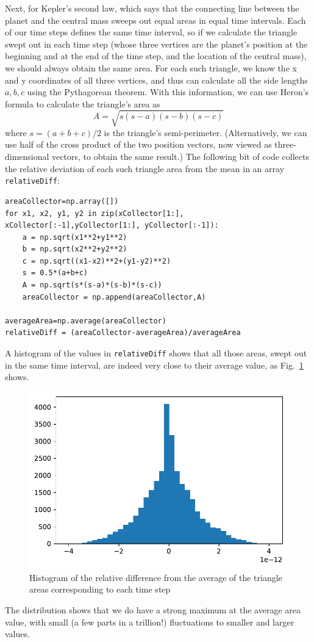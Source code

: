 \documentclass[twocolumn,apj]{openjournal}
\newcommand{\be}{\begin{equation}}
\newcommand{\ee}{\end{equation}}
\begin{document}
Next, for Kepler's second law, which says that the connecting line between the planet and the central mass sweeps out equal areas in equal time intervals. Each of our time steps defines the same time interval, so if we calculate the triangle swept out in each time step (whose three vertices are the planet's position at the beginning and at the end of the time step, and the location of the central mass), we should always obtain the same area. For each such triangle, we know the x and y coordinates of all three vertices, and thus can calculate all the side lengths $a,b,c$ using the Pythagorean theorem. With this information, we can use Heron's formula to calculate the triangle's area as
\be
A = \sqrt{s(s-a)(s-b)(s-c)}
\ee
where $s=(a+b+c)/2$ is the triangle's semi-perimeter. (Alternatively, we can use half of the cross product of the two position vectors, now viewed as three-dimensional vectors, to obtain the same result.) The following bit of code collects the relative deviation of each such triangle area from the mean in an array \verb|relativeDiff|:
\begin{lstlisting}
areaCollector=np.array([])
for x1, x2, y1, y2 in zip(xCollector[1:], xCollector[:-1],yCollector[1:], yCollector[:-1]):
    a = np.sqrt(x1**2+y1**2)
    b = np.sqrt(x2**2+y2**2)
    c = np.sqrt((x1-x2)**2+(y1-y2)**2)
    s = 0.5*(a+b+c)
    A = np.sqrt(s*(s-a)*(s-b)*(s-c))
    areaCollector = np.append(areaCollector,A)
    
averageArea=np.average(areaCollector)
relativeDiff = (areaCollector-averageArea)/averageArea
\end{lstlisting}
A histogram of the values in \verb|relativeDiff| shows that all those areas, swept out in the same time interval, are indeed very close to their average value, as Fig.~\ref{KeplerAreaHisto} shows.
\begin{figure}[htbp]
\begin{center}
\includegraphics[width=\linewidth]{keplerSecond.pdf}
\caption{Histogram of the relative difference from the average of the triangle areas corresponding to each time step}
\label{KeplerAreaHisto}
\end{center}
\end{figure}
The distribution shows that we do have a strong maximum at the average area value, with small (a few parts in a trillion!) fluctuations to smaller and larger values. 
\end{document}
